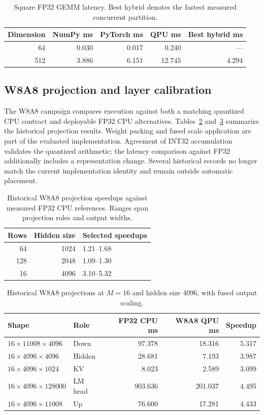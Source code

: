 \documentclass[sigplan,screen,review]{acmart}
\begin{document}
\begin{table}[t]
\centering
\caption{Square FP32 GEMM latency. Best hybrid denotes the fastest measured concurrent partition.}
\label{tab:square-gemm}
\small
\begin{tabular}{@{}rrrrr@{}}
\toprule
Dimension & NumPy ms & PyTorch ms & QPU ms & Best hybrid ms \\
\midrule
64 & 0.030 & 0.017 & 0.240 & --- \\
512 & 3.886 & 6.151 & 12.745 & 4.294 \\
\bottomrule
\end{tabular}
\end{table}

\subsection{W8A8 projection and layer calibration}
\label{app:w8}

The W8A8 campaign compares execution against both a matching quantized CPU contract and deployable FP32 CPU alternatives. Tables~\ref{tab:w8-families} and~\ref{tab:w8-wide} summarize the historical projection results. Weight packing and fused scale application are part of the evaluated implementation. Agreement of INT32 accumulation validates the quantized arithmetic; the latency comparison against FP32 additionally includes a representation change. Several historical records no longer match the current implementation identity and remain outside automatic placement.

\begin{table}[t]
\centering
\caption{Historical W8A8 projection speedups against measured FP32 CPU references. Ranges span projection roles and output widths.}
\label{tab:w8-families}
\small
\begin{tabular}{@{}rrl@{}}
\toprule
Rows & Hidden size & Selected speedups \\
\midrule
64 & 1024 & 1.21--1.68 \\
128 & 2048 & 1.09--1.30 \\
16 & 4096 & 3.10--5.32 \\
\bottomrule
\end{tabular}
\end{table}

\begin{table}[t]
\centering
\caption{Historical W8A8 projections at $M=16$ and hidden size 4096, with fused output scaling.}
\label{tab:w8-wide}
\small
\begin{tabular}{@{}llrrr@{}}
\toprule
Shape & Role & FP32 CPU ms & W8A8 QPU ms & Speedup \\
\midrule
$16\times11008\times4096$ & Down & 97.378 & 18.316 & 5.317 \\
$16\times4096\times4096$ & Hidden & 28.681 & 7.193 & 3.987 \\
$16\times4096\times1024$ & KV & 8.023 & 2.589 & 3.099 \\
$16\times4096\times128000$ & LM head & 903.636 & 201.037 & 4.495 \\
$16\times4096\times11008$ & Up & 76.600 & 17.281 & 4.433 \\
\bottomrule
\end{tabular}
\end{table}
\end{document}

